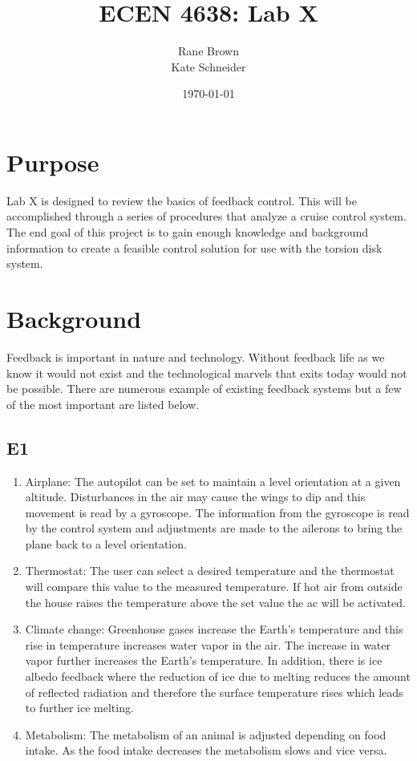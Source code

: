 \documentclass[10pt,titlepage]{article}
\author{Rane Brown \\ Kate Schneider}
\title{ECEN 4638: Lab X}
\date{\today}
\begin{document}
\maketitle

\section*{Purpose}
	Lab X is designed to review the basics of feedback control. This will be accomplished through a series of procedures that analyze a cruise control system. The end goal of this project is to gain enough knowledge and background information to create a feasible control solution for use with the torsion disk system.

\section*{Background}
	Feedback is important in nature and technology. Without feedback life as we know it would not exist and the technological marvels that exits today would not be possible. There are numerous example of existing feedback systems but a few of the most important are listed below.

	\subsection*{E1}
		\begin{enumerate}
			\item Airplane: The autopilot can be set to maintain a level orientation at a given altitude. Disturbances in the air may cause the wings to dip and this movement is read by a gyroscope. The information from the gyroscope is read by the control system and adjustments are made to the ailerons to bring the plane back to a level orientation.
			\item Thermostat: The user can select a desired temperature and the thermostat will compare this value to the measured temperature. If hot air from outside the house raises the temperature above the set value the ac will be activated. 
			\item Climate change: Greenhouse gases increase the Earth's temperature and this rise in temperature increases water vapor in the air. The increase in water vapor further increases the Earth's temperature. In addition, there is ice albedo feedback where the reduction of ice due to melting reduces the amount of reflected radiation and therefore the surface temperature rises which leads to further ice melting.
			\item Metabolism: The metabolism of an animal is adjusted depending on food intake. As the food intake decreases the metabolism slows and vice versa.
		\end{enumerate}
\end{document}
